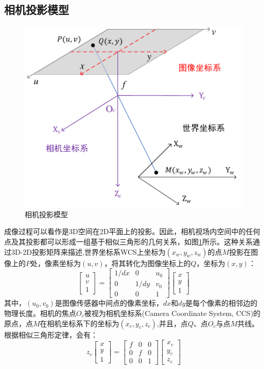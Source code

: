 \subsection{相机投影模型}
\begin{figure}[!t]
  \centering
  \includegraphics[width=0.6\linewidth]{FIG/CS.pdf}
  \caption{相机投影模型}
  \label{fig:CS}
\end{figure}
成像过程可以看作是3D空间在2D平面上的投影。因此，相机视场内空间中的任何点及其投影都可以形成一组基于相似三角形的几何关系，如图\ref{fig:CS}所示。这种关系通过3D-2D投影矩阵来描述,世界坐标系WCS上坐标为$(x_w,y_w,z_w)$的点$M$投影在图像上的$P$处，像素坐标为$(u,v)$，将其转化为图像坐标上的$Q$，坐标为$(x,y)$：
\begin{equation}\label{mx:pixel-uvxy}
      \begin{bmatrix}
        u\\
        v\\
       1
       \end{bmatrix}=\begin{bmatrix}
        1/dx & 0 &u_{0} \\
         0& 1/dy &v_{0} \\
         0& 0 &1
       \end{bmatrix}\begin{bmatrix}
        x\\
        y\\
       1
       \end{bmatrix}
\end{equation}
其中，$(u_0,v_0)$是图像传感器中间点的像素坐标，$dx$和$dy$是每个像素的相邻边的物理长度。相机的焦点$O_c$被视为相机坐标系(Camera Coordinate System, CCS)的原点，点$M$在相机坐标系下的坐标为$(x_c,y_c,z_c)$,并且，点$Q$、点$O_c$与点$M$共线。根据相似三角形定律，会有：
 \begin{equation}\label{mx:cemara-xycc}
        z_{c}\begin{bmatrix}
          x\\
          y\\
         1
         \end{bmatrix}=\begin{bmatrix}
          f & 0 &0 \\
           0& f &0 \\
           0& 0 &1
         \end{bmatrix}\begin{bmatrix}
          x_{c}\\
          y_{c}\\
         z_{c}
         \end{bmatrix}
  \end{equation}
